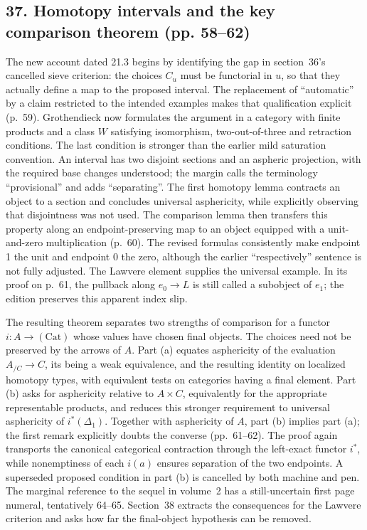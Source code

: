 \subsection*{37. Homotopy intervals and the key comparison theorem (pp. 58--62)}
The new account dated 21.3 begins by identifying the gap in section~36's cancelled sieve criterion: the choices $C_u$ must be functorial in $u$, so that they actually define a map to the proposed interval. The replacement of ``automatic'' by a claim restricted to the intended examples makes that qualification explicit (p.~59). Grothendieck now formulates the argument in a category with finite products and a class $W$ satisfying isomorphism, two-out-of-three and retraction conditions. The last condition is stronger than the earlier mild saturation convention. An interval has two disjoint sections and an aspheric projection, with the required base changes understood; the margin calls the terminology ``provisional'' and adds ``separating''. The first homotopy lemma contracts an object to a section and concludes universal asphericity, while explicitly observing that disjointness was not used. The comparison lemma then transfers this property along an endpoint-preserving map to an object equipped with a unit-and-zero multiplication (p.~60). The revised formulas consistently make endpoint 1 the unit and endpoint 0 the zero, although the earlier ``respectively'' sentence is not fully adjusted. The Lawvere element supplies the universal example. In its proof on p.~61, the pullback along $e_0\to L$ is still called a subobject of $e_1$; the edition preserves this apparent index slip.

The resulting theorem separates two strengths of comparison for a functor $i:A\to(\mathrm{Cat})$ whose values have chosen final objects. The choices need not be preserved by the arrows of $A$. Part (a) equates asphericity of the evaluation $A_{/C}\to C$, its being a weak equivalence, and the resulting identity on localized homotopy types, with equivalent tests on categories having a final element. Part (b) asks for asphericity relative to $A\times C$, equivalently for the appropriate representable products, and reduces this stronger requirement to universal asphericity of $i^*(\Delta_1)$. Together with asphericity of $A$, part (b) implies part (a); the first remark explicitly doubts the converse (pp.~61--62). The proof again transports the canonical categorical contraction through the left-exact functor $i^*$, while nonemptiness of each $i(a)$ ensures separation of the two endpoints. A superseded proposed condition in part (b) is cancelled by both machine and pen. The marginal reference to the sequel in volume~2 has a still-uncertain first page numeral, tentatively 64--65. Section~38 extracts the consequences for the Lawvere criterion and asks how far the final-object hypothesis can be removed.

